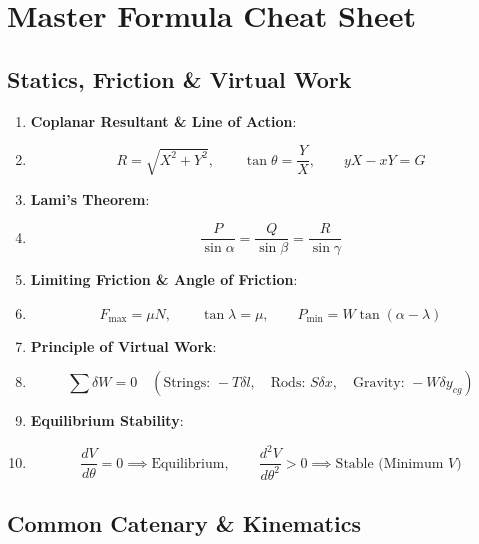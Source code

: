 \chapter{Master Formula Cheat Sheet}

\section{Statics, Friction \& Virtual Work}

\begin{keybox}
\begin{enumerate}[leftmargin=1.5em]
    \item \textbf{Coplanar Resultant \& Line of Action}:
    \item \[ R = \sqrt{X^2 + Y^2}, \qquad \tan\theta = \frac{Y}{X}, \qquad y X - x Y = G \]
    
    \item \textbf{Lami's Theorem}:
    \item \[ \frac{P}{\sin\alpha} = \frac{Q}{\sin\beta} = \frac{R}{\sin\gamma} \]
    
    \item \textbf{Limiting Friction \& Angle of Friction}:
    \item \[ F_{\max} = \mu N, \qquad \tan\lambda = \mu, \qquad P_{\min} = W\tan(\alpha-\lambda) \]
    
    \item \textbf{Principle of Virtual Work}:
    \item \[ \sum \delta W = 0 \quad (\text{Strings: } -T\delta l, \quad \text{Rods: } S\delta x, \quad \text{Gravity: } -W\delta y_{cg}) \]
    
    \item \textbf{Equilibrium Stability}:
    \item \[ \frac{dV}{d\theta} = 0 \implies \text{Equilibrium}, \qquad \frac{d^2V}{d\theta^2} > 0 \implies \text{Stable (Minimum } V) \]
\end{enumerate}
\end{keybox}

\section{Common Catenary \& Kinematics}

